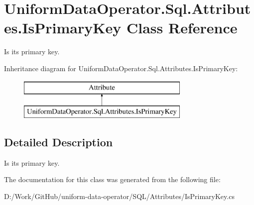 \hypertarget{class_uniform_data_operator_1_1_sql_1_1_attributes_1_1_is_primary_key}{}\section{Uniform\+Data\+Operator.\+Sql.\+Attributes.\+Is\+Primary\+Key Class Reference}
\label{class_uniform_data_operator_1_1_sql_1_1_attributes_1_1_is_primary_key}


Is it\textquotesingle{}s primary key.  


Inheritance diagram for Uniform\+Data\+Operator.\+Sql.\+Attributes.\+Is\+Primary\+Key\+:\begin{figure}[H]
\begin{center}
\leavevmode
\includegraphics[height=2.000000cm]{d4/da1/class_uniform_data_operator_1_1_sql_1_1_attributes_1_1_is_primary_key}
\end{center}
\end{figure}


\subsection{Detailed Description}
Is it\textquotesingle{}s primary key. 



The documentation for this class was generated from the following file\+:\begin{DoxyCompactItemize}
\item 
D\+:/\+Work/\+Git\+Hub/uniform-\/data-\/operator/\+S\+Q\+L/\+Attributes/Is\+Primary\+Key.\+cs\end{DoxyCompactItemize}

